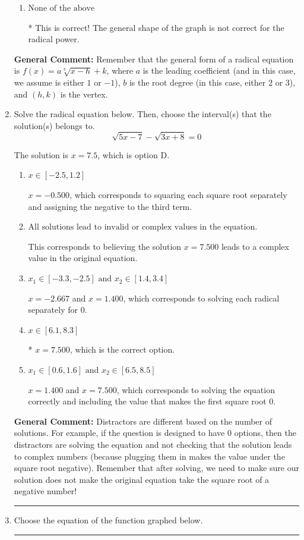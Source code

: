 \documentclass{extbook}[14pt]
\newcommand{\litem}[1]{\item #1

\rule{\textwidth}{0.4pt}}
\begin{document}
\begin{enumerate}
{\begin{enumerate}[label=\Alph*.]
This corresponds to switching the coefficient AND switching the $x$-value of the vertex with the root degree as $3$.
\item \( \text{None of the above} \)

* This is correct! The general shape of the graph is not correct for the radical power.
\end{enumerate}

\textbf{General Comment:} Remember that the general form of a radical equation is $ f(x) = a \sqrt[b]{x - h} + k$, where $a$ is the leading coefficient (and in this case, we assume is either $1$ or $-1$), $b$ is the root degree (in this case, either $2$ or $3$), and $(h, k)$ is the vertex.
}
\litem{
Solve the radical equation below. Then, choose the interval(s) that the solution(s) belongs to.
\[ \sqrt{5 x - 7} - \sqrt{3 x + 8} = 0 \]

The solution is \( x = 7.5 \), which is option D.\begin{enumerate}[label=\Alph*.]
\item \( x \in [-2.5,1.2] \)

$x = -0.500$, which corresponds to squaring each square root separately and assigning the negative to the third term.
\item \( \text{All solutions lead to invalid or complex values in the equation.} \)

This corresponds to believing the solution $x = 7.500$ leads to a complex value in the original equation.
\item \( x_1 \in [-3.3, -2.5] \text{ and } x_2 \in [1.4,3.4] \)

$x = -2.667$ and $x = 1.400$, which corresponds to solving each radical separately for 0.
\item \( x \in [6.1,8.3] \)

* $x = 7.500$, which is the correct option.
\item \( x_1 \in [0.6, 1.6] \text{ and } x_2 \in [6.5,8.5] \)

$x = 1.400$ and $x = 7.500$, which corresponds to solving the equation correctly and including the value that makes the first square root 0.
\end{enumerate}

\textbf{General Comment:} Distractors are different based on the number of solutions. For example, if the question is designed to have 0 options, then the distractors are solving the equation and not checking that the solution leads to complex numbers (because plugging them in makes the value under the square root negative). Remember that after solving, we need to make sure our solution does not make the original equation take the square root of a negative number!
}
\litem{
Choose the equation of the function graphed below.

}
\end{enumerate}
\end{document}
